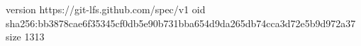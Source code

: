 version https://git-lfs.github.com/spec/v1
oid sha256:bb3878cae6f35345cf0db5e90b731bba654d9da265db74cca3d72e5b9d972a37
size 1313
